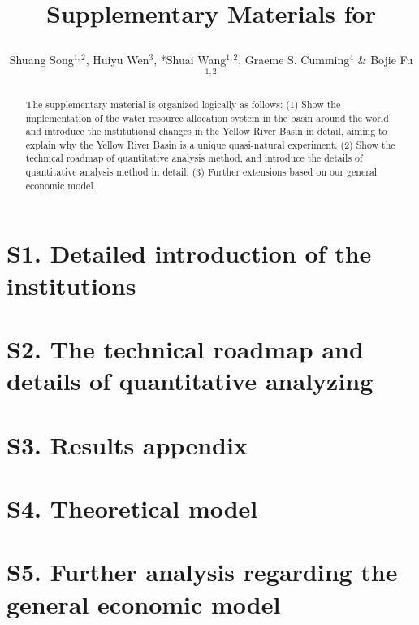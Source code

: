 \documentclass{article}
\title{Supplementary Materials for

}
\author{Shuang Song$^{1,2}$, Huiyu Wen$^3$, *Shuai Wang$^{1,2}$, Graeme S. Cumming$^{4}$ \& Bojie Fu$^{1, 2}$}
\begin{document}
\maketitle

\begin{abstract}
    The supplementary material is organized logically as follows:
    (1) Show the implementation of the water resource allocation system in the basin around the world and introduce the institutional changes in the Yellow River Basin in detail, aiming to explain why the Yellow River Basin is a unique quasi-natural experiment.
    (2) Show the technical roadmap of quantitative analysis method, and introduce the details of quantitative analysis method in detail.
    (3) Further extensions based on our general economic model.
\end{abstract}

\section*{S1. Detailed introduction of the institutions}


\section*{S2. The technical roadmap and details of quantitative analyzing}


\section*{S3. Results appendix}


\section*{S4. Theoretical model}


\section*{S5. Further analysis regarding the general economic model}



\end{document}
